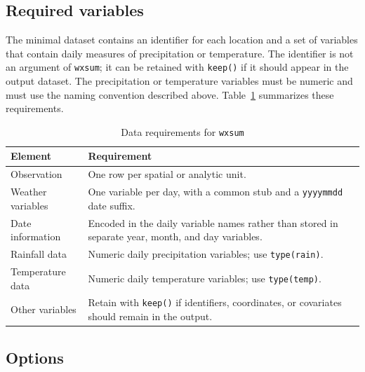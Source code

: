 \subsection{Required variables}

The minimal dataset contains an identifier for each location and a set of variables that contain daily measures of precipitation or temperature. The identifier is not an argument of \texttt{wxsum}; it can be retained with \texttt{keep()} if it should appear in the output dataset. The precipitation or temperature variables must be numeric and must use the naming convention described above. Table~\ref{tab:datareq} summarizes these requirements.

\begin{table}[htbp]
	\caption{Data requirements for \texttt{wxsum}}
	\label{tab:datareq}
	\begin{center}
		\begin{tabularx}{\textwidth}{lX}
			\hline
			Element & Requirement \\
			\hline
			Observation & One row per spatial or analytic unit. \\
			Weather variables & One variable per day, with a common stub and a \texttt{yyyymmdd} date suffix. \\
			Date information & Encoded in the daily variable names rather than stored in separate year, month, and day variables. \\
			Rainfall data & Numeric daily precipitation variables; use \texttt{type(rain)}. \\
			Temperature data & Numeric daily temperature variables; use \texttt{type(temp)}. \\
			Other variables & Retain with \texttt{keep()} if identifiers, coordinates, or covariates should remain in the output. \\
			\hline
		\end{tabularx}
	\end{center}
\end{table}

\subsection{Options}

